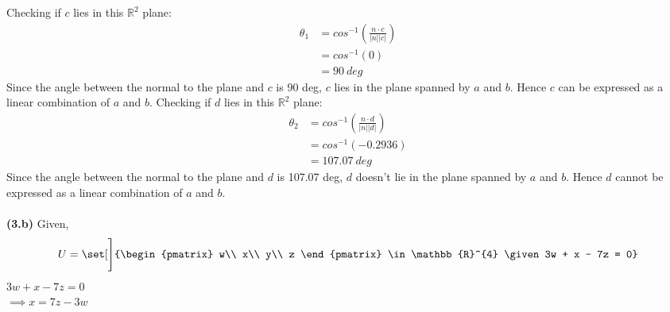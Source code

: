 \documentclass[12pt,letterpaper,fleqn]{article}
\theoremstyle{definition}
\begin{document}
Checking if $c$ lies in this $\mathbb{R}^{2}$ plane:\\
\begin{equation*}
\begin{split}
\theta_1 &= cos^{-1}\left(\frac{n \cdot c}{|n| |c|}\right)\\
&= cos^{-1}(0)\\
&= 90~deg
\end{split}
\end{equation*}
Since the angle between the normal to the plane and $c$ is 90 deg, $c$ lies in the plane spanned by $a$ and $b$. Hence $c$ can be expressed as a linear combination of $a$ and $b$.
Checking if $d$ lies in this $\mathbb{R}^{2}$ plane:\\
\begin{equation*}
\begin{split}
\theta_2 &= cos^{-1}\left(\frac{n \cdot d}{|n| |d|}\right)\\
&= cos^{-1}(-0.2936)\\
&= 107.07~deg
\end{split}
\end{equation*}
Since the angle between the normal to the plane and $d$ is 107.07 deg, $d$ doesn't lie in the plane spanned by $a$ and $b$. Hence $d$ cannot be expressed as a linear combination of $a$ and $b$.
\\
\\
\textbf{(3.b)}
Given,\\
\begin{equation*}
U = \set[\Bigg]{\begin{pmatrix}
w\\
x\\
y\\
z
\end{pmatrix} \in \mathbb{R}^{4} \given 3w + x - 7z = 0}
\end{equation*}
$ 3w + x - 7z = 0$ \\
$\implies x = 7z - 3w$\\
\end{document}

